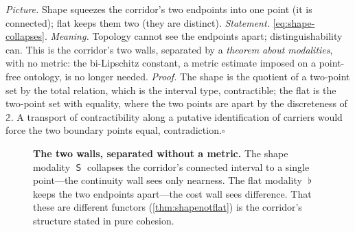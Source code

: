\documentclass[11pt,letterpaper]{article}
\theoremstyle{plain}
\theoremstyle{definition}
\theoremstyle{remark}
\newcommand{\shapeM}{\mathop{\mathsf{S}}\nolimits}      %
\newcommand{\flatM}{\mathop{\flat}\nolimits}            %
\newcommand{\Bd}{\partial}                              %
\newcommand{\isContr}{\mathsf{isContr}}
\newcommand{\unmk}{\mathsf{u}}                          %
\newcommand{\mkd}{\mathsf{m}}                           %
\begin{document}
\noindent\emph{Picture.} Shape squeezes the corridor's two endpoints into one
point (it is connected); flat keeps them two (they are distinct). \emph{Statement.}
\cref{eq:shape-collapses}. \emph{Meaning.} Topology cannot see the endpoints
apart; distinguishability can. This is the corridor's two walls, separated by a
\emph{theorem about modalities}, with no metric: the bi-Lipschitz constant, a
metric estimate imposed on a point-free ontology, is no longer needed.
\emph{Proof.} The shape
is the quotient of a two-point set by the total relation, which is the interval
type, contractible; the flat is the two-point set with equality, where the two
points are apart by the discreteness of $\mathbb{2}$. A transport of
contractibility along a putative identification of carriers would force the two
boundary points equal, contradiction.\hfill$\square$

\begin{figure}[t]
\centering
{}
\caption{\textbf{The two walls, separated without a metric.} The shape modality
$\shapeM$ collapses the corridor's connected interval to a single point---the
continuity wall sees only nearness. The flat modality $\flatM$ keeps the two
endpoints apart---the cost wall sees difference. That these are different functors
(\cref{thm:shapenotflat}) is the corridor's structure stated in pure cohesion.}
\label{fig:two-walls}
\end{figure}
\end{document}
